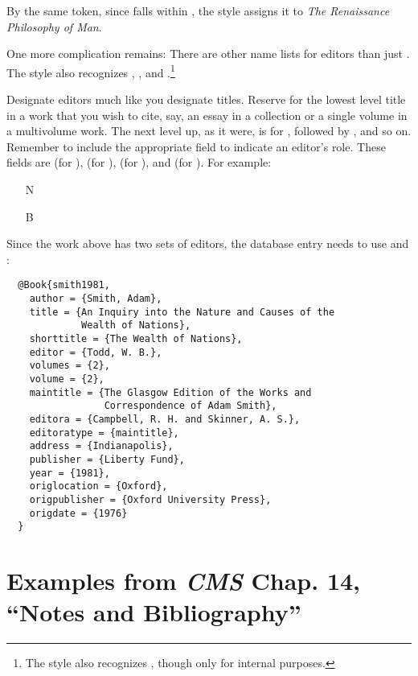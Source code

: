 \documentclass[11pt,letterpaper,oneside]{article}
\begin{document}
\noindent By the same token, since  falls within
, the style assigns it to \textit{The Renaissance
Philosophy of Man}.

One more complication remains: There are other name lists for editors
than just . The style also recognizes
, , and
.\footnote{The style also recognizes
, though only for internal purposes.}

Designate editors much like you designate titles. Reserve
 for the lowest level title in a work that you wish
to cite, say, an essay in a collection or a single volume in a
multivolume work. The next level up, as it were, is for
, followed by , and so on.
Remember to include the appropriate  field to indicate
an editor's role. These fields are  (for
),  (for ),
 (for ), and
 (for ). For example:

\begin{itemize}
\item[N] 

\item[B] 
\end{itemize}

\noindent Since the work above has two sets of editors, the database
entry needs to use  and :

\begin{lstlisting}
  @Book{smith1981,
    author = {Smith, Adam},
    title = {An Inquiry into the Nature and Causes of the
             Wealth of Nations},
    shorttitle = {The Wealth of Nations},
    editor = {Todd, W. B.},
    volumes = {2},
    volume = {2},
    maintitle = {The Glasgow Edition of the Works and
                 Correspondence of Adam Smith},
    editora = {Campbell, R. H. and Skinner, A. S.},
    editoratype = {maintitle},
    address = {Indianapolis},
    publisher = {Liberty Fund},
    year = {1981},
    origlocation = {Oxford},
    origpublisher = {Oxford University Press},
    origdate = {1976}
  }
\end{lstlisting}

\section{Examples from \emph{CMS} Chap. 14, ``Notes and
Bibliography''} \label{notes16}
\end{document}
